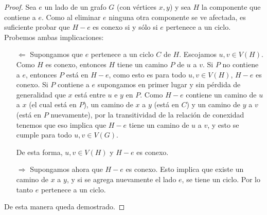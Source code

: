 \begin{proof}
    Sea $e$ un lado de un grafo $G$ (con vértices $x,y$) y sea $H$ la componente que contiene a $e$. Como al eliminar $e$ ninguna otra componente se ve afectada, es suficiente probar que $H - e$ es conexo si y sólo si $e$ pertenece a un ciclo. Probemos ambas implicaciones:
    
    \begin{enumerate}
        \item[$\Leftarrow$] Supongamos que $e$ pertenece a un ciclo $C$ de $H$. Escojamos $u, v \in V(H)$. Como $H$ es conexo, entonces $H$ tiene un camino $P$ de $u$ a $v$. Si $P$ no contiene a $e$, entonces $P$ está en $H - e$, como esto es para todo $u, v \in V(H)$, $H - e$ es conexo. Si $P$ contiene a $e$ supongamos en primer lugar y sin pérdida de generalidad que $x$ está entre $u$ e $y$ en $P$. Como $H - e$ contiene un camino de $u$ a $x$ (el cual está en $P$), un camino de $x$ a $y$ (está en $C$) y un camino de $y$ a $v$ (está en $P$ nuevamente), por la transitividad de la relación de conexidad tenemos que eso implica que $H - e$ tiene un camino de $u$ a $v$, y esto se cumple para todo $u, v \in V(G)$.
        
        De esta forma, $u, v \in V(H)$ y $H - e$ es conexo.
        
        \item[$\Rightarrow$] Supongamos ahora que $H - e$ es conexo. Esto implica que existe un camino de $x$ a $y$, y si se agrega nuevamente el lado $e$, se tiene un ciclo. Por lo tanto $e$ pertenece a un ciclo.
    \end{enumerate}
    
    De esta manera queda demostrado.
\end{proof}
